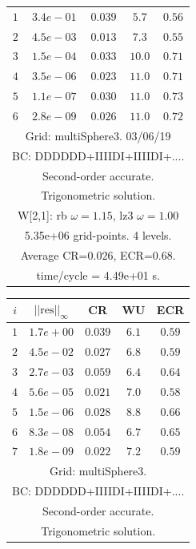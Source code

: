 \begin{table}[hbt]
\begin{center}
{\begin{tabular}{|c|c|c|c|c|}
 $ 1$  & $ 3.4e-01$ & $0.039$ & $ 5.7$ & $0.56$ \\ 
 $ 2$  & $ 4.5e-03$ & $0.013$ & $ 7.3$ & $0.55$ \\ 
 $ 3$  & $ 1.5e-04$ & $0.033$ & $10.0$ & $0.71$ \\ 
 $ 4$  & $ 3.5e-06$ & $0.023$ & $11.0$ & $0.71$ \\ 
 $ 5$  & $ 1.1e-07$ & $0.030$ & $11.0$ & $0.73$ \\ 
 $ 6$  & $ 2.8e-09$ & $0.026$ & $11.0$ & $0.72$ \\ 
\hline 
\multicolumn{5}{|c|}{Grid: multiSphere3. 03/06/19}  \\
\multicolumn{5}{|c|}{BC: DDDDDD+IIIIDI+IIIIDI+....}  \\
\multicolumn{5}{|c|}{Second-order accurate.}  \\
\multicolumn{5}{|c|}{Trigonometric solution.}  \\
\multicolumn{5}{|c|}{W[2,1]: rb $\omega=1.15$, lz3 $\omega=1.00$}  \\
\multicolumn{5}{|c|}{5.35e+06 grid-points. 4 levels.}  \\
\multicolumn{5}{|c|}{Average CR=$0.026$, ECR=$0.68$.}  \\
\multicolumn{5}{|c|}{time/cycle = 4.49e+01 s.}  \\
\hline 
\end{tabular}
\begin{tabular}{|c|c|c|c|c|} \hline 
 $i$   & $\vert\vert\mbox{res}\vert\vert_\infty$  &  CR     &  WU    & ECR  \\   \hline 
 $ 1$  & $ 1.7e+00$ & $0.039$ & $ 6.1$ & $0.59$ \\ 
 $ 2$  & $ 4.5e-02$ & $0.027$ & $ 6.8$ & $0.59$ \\ 
 $ 3$  & $ 2.7e-03$ & $0.059$ & $ 6.4$ & $0.64$ \\ 
 $ 4$  & $ 5.6e-05$ & $0.021$ & $ 7.0$ & $0.58$ \\ 
 $ 5$  & $ 1.5e-06$ & $0.028$ & $ 8.8$ & $0.66$ \\ 
 $ 6$  & $ 8.3e-08$ & $0.054$ & $ 6.7$ & $0.65$ \\ 
 $ 7$  & $ 1.8e-09$ & $0.022$ & $ 7.2$ & $0.59$ \\ 
\hline 
\multicolumn{5}{|c|}{Grid: multiSphere3.}  \\
\multicolumn{5}{|c|}{BC: DDDDDD+IIIIDI+IIIIDI+....}  \\
\multicolumn{5}{|c|}{Second-order accurate.}  \\
\multicolumn{5}{|c|}{Trigonometric solution.}  \\

\end{tabular}}
\end{center}
\end{table}
